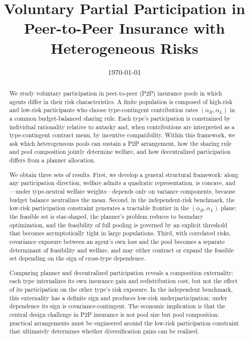 \documentclass[a4paper,12pt]{article}
\title{Voluntary Partial Participation in Peer-to-Peer Insurance with Heterogeneous Risks}
\date{\today}
\theoremstyle{definition}
\theoremstyle{remark}
\newcommand{\1}{\mathbf{1}}
\begin{document}
\maketitle

\begin{abstract}
We study voluntary participation in peer-to-peer (P2P) insurance pools in which 
agents differ in their risk characteristics. A finite population is composed of 
high-risk and low-risk participants who choose type-contingent contribution 
rates \((\alpha_H,\alpha_L)\) in a common budget-balanced sharing rule. Each 
type's participation is constrained by individual rationality relative to 
autarky and, when contributions are interpreted as a type-contingent contract 
menu, by incentive compatibility. Within this framework, we ask which 
heterogeneous pools can sustain a P2P arrangement, how the sharing rule and 
pool composition jointly determine welfare, and how decentralized participation 
differs from a planner allocation.

We obtain three sets of results. First, we develop a general structural 
framework: along any participation direction, welfare admits a quadratic 
representation, is concave, and---under type-neutral welfare weights---depends 
only on variance components, because budget balance neutralizes the mean. 
Second, in the independent-risk benchmark, the low-risk participation 
constraint generates a tractable frontier in the \((\alpha_H,\alpha_L)\) plane: 
the feasible set is star-shaped, the planner's problem reduces to boundary 
optimization, and the feasibility of full pooling is governed by an explicit 
threshold that becomes asymptotically tight in large populations. Third, with 
correlated risks, covariance exposure between an agent's own loss and the pool 
becomes a separate determinant of feasibility and welfare, and may either 
contract or expand the feasible set depending on the sign of cross-type 
dependence.

Comparing planner and decentralized participation reveals a composition 
externality: each type internalizes its own insurance gain and redistribution 
cost, but not the effect of its participation on the other type's risk 
exposure. In the independent benchmark, this externality has a definite sign 
and produces low-risk underparticipation; under dependence its sign is 
covariance-contingent. The economic implication is that the central design 
challenge in P2P insurance is not pool size but pool composition: practical 
arrangements must be engineered around the low-risk participation constraint 
that ultimately determines whether diversification gains can be realized.
\end{abstract}
\end{document}
